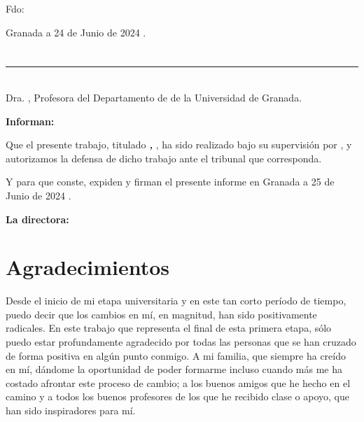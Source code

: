 \vspace{6cm}

\noindent Fdo: \myName

\vspace{2cm}

\begin{flushright}
Granada a 24 de Junio de 2024 .
\end{flushright}


\chapter*{}
\thispagestyle{empty}

\noindent\rule[-1ex]{\textwidth}{2pt}\\[4.5ex]

Dra. \textbf{\myProf}, Profesora del Departamento de \myDepartment de la Universidad de Granada.


\vspace{0.5cm}

\textbf{Informan:}

\vspace{0.5cm}

Que el presente trabajo, titulado \textit{\textbf{\myTitle, \mySubTitle}},
ha sido realizado bajo su supervisión por \textbf{\myName}, y autorizamos la defensa de dicho trabajo ante el tribunal que corresponda.

\vspace{0.5cm}

Y para que conste, expiden y firman el presente informe en Granada a 25 de Junio de 2024 .

\vspace{1cm}

\textbf{La directora:}

\vspace{5cm}

\noindent \textbf{}

\chapter*{Agradecimientos}
\thispagestyle{empty}
\vspace{1cm}


Desde el inicio de mi etapa universitaria y en este tan corto período de tiempo, puedo decir que los cambios en mí, en magnitud, han sido positivamente radicales. En este trabajo que representa el final de esta primera etapa, sólo puedo estar profundamente agradecido por todas las personas que se han cruzado de forma positiva en algún punto conmigo. A mi familia, que siempre ha creído en mí, dándome la oportunidad de poder formarme incluso cuando más me ha costado afrontar este proceso de cambio; a los buenos amigos que he hecho en el camino y a todos los buenos profesores de los que he recibido clase o apoyo, que han sido inspiradores para mí.
